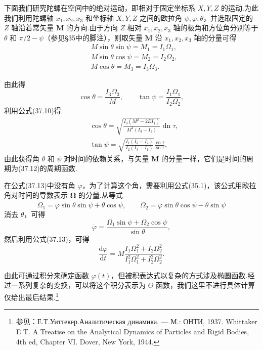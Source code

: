 下面我们研究陀螺在空间中的绝对运动，即相对于固定坐标系 $X,Y,Z$ 的运动.为此我们利用陀螺轴 $x_1,x_2,x_3$ 和坐标轴 $X,Y,Z$ 之间的欧拉角 $\psi,\varphi,\theta$，并选取固定的 $Z$ 轴沿着常矢量 $\boldsymbol{M}$ 的方向.由于方向 $Z$ 相对 $x_1,x_2,x_3$ 轴的极角和方位角分别等于 $\theta$ 和 $\pi/2-\psi$（参见§35中的脚注），则取矢量 $\boldsymbol{M}$ 沿 $x_1,x_2,x_3$ 轴的分量可得
\begin{equation}
\begin{aligned}
  &M\sin\theta\sin\psi=M_1=I_1\Omega_1,\\
  &M\sin\theta\cos\psi=M_2=I_2\Omega_2,\\
  &M\cos\theta=M_3=I_3\Omega_3.
\end{aligned}
\end{equation}

由此得
\begin{equation}
  \cos\theta=\frac{I_3\Omega_3}{M},\qquad
  \tan\psi=\frac{I_1\Omega_1}{I_2\Omega_2},
\end{equation}
利用公式(37.10)得
\begin{equation}
\begin{aligned}
  &\cos\theta=\sqrt{\frac{I_3\left(M^2-2EI_1\right)}
  {M^2(I_3-I_1)}}\operatorname{dn}\tau,\\
  &\tan\psi=\sqrt{\frac{I_1(I_3-I_2)}{I_2(I_3-I_1)}}
  \frac{\operatorname{cn}\tau}{\operatorname{sn}\tau},
\end{aligned}
\end{equation}
由此获得角 $\theta$ 和 $\psi$ 对时间的依赖关系，与矢量 $\boldsymbol{M}$ 的分量一样，它们是时间的周期为(37.12)的周期函数.

在公式(37.13)中没有角 $\varphi$，为了计算这个角，需要利用公式(35.1)，该公式用欧拉角对时间的导数表示 $\boldsymbol{\Omega}$ 的分量.从等式
\begin{equation*}
  \Omega_1=\dot{\varphi}\sin\theta\sin\psi+\dot{\theta}\cos\psi,\qquad
  \Omega_2=\dot{\varphi}\sin\theta\cos\psi-\dot{\theta}\sin\psi
\end{equation*}
消去 $\dot{\theta}$，可得
\begin{equation*}
  \dot{\varphi}=\frac{\Omega_1\sin\psi+\Omega_2\cos\psi}{\sin\theta},
\end{equation*}
然后利用公式(37.13)，可得
\begin{equation}
  \frac{\mathrm{d}\varphi}{\mathrm{d}t}
  =M\frac{I_1\Omega_1^2+I_2\Omega_2^2}{I_1^2\Omega_1^2+I_2^2\Omega_2^2}.
\end{equation}

由此可通过积分来确定函数 $\varphi(t)$，但被积表达式以复杂的方式涉及椭圆函数.经过一系列复杂的变换，可以将这个积分表示为 $\Theta$ 函数，我们这里不进行具体计算仅给出最后结果.\footnote{参见：Е.Т.Уиттекер.Аналитическая динамика. — М.: ОНТИ, 1937. Whittaker E T. A Treatise on the Analytical Dynamics of Particles and Rigid Bodies, 4th ed, Chapter VI. Dover, New York, 1944.}

